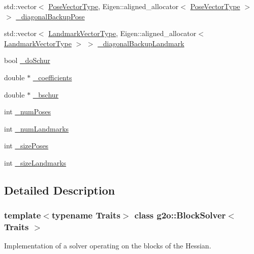 \begin{DoxyCompactItemize}
\item 
std\+::vector$<$ \mbox{\hyperlink{classg2o_1_1_block_solver_a65d51b9281e2e2597df05eb00801ee76}{Pose\+Vector\+Type}}, Eigen\+::aligned\+\_\+allocator$<$ \mbox{\hyperlink{classg2o_1_1_block_solver_a65d51b9281e2e2597df05eb00801ee76}{Pose\+Vector\+Type}} $>$ $>$ \mbox{\hyperlink{classg2o_1_1_block_solver_a3cb6f86c522c2ea26478ad44b7c32f76}{\+\_\+diagonal\+Backup\+Pose}}
\item 
std\+::vector$<$ \mbox{\hyperlink{classg2o_1_1_block_solver_a19ade5e432f32e46557192ae75074304}{Landmark\+Vector\+Type}}, Eigen\+::aligned\+\_\+allocator$<$ \mbox{\hyperlink{classg2o_1_1_block_solver_a19ade5e432f32e46557192ae75074304}{Landmark\+Vector\+Type}} $>$ $>$ \mbox{\hyperlink{classg2o_1_1_block_solver_a3bc5b19faa2c45e2c04a6743b3a083de}{\+\_\+diagonal\+Backup\+Landmark}}
\item 
bool \mbox{\hyperlink{classg2o_1_1_block_solver_ab375a5fac964182442f38288bd8a103a}{\+\_\+do\+Schur}}
\item 
double $\ast$ \mbox{\hyperlink{classg2o_1_1_block_solver_a416f480d4b27d7f8962ae7ae363f2e32}{\+\_\+coefficients}}
\item 
double $\ast$ \mbox{\hyperlink{classg2o_1_1_block_solver_aafddeb1d0a4218fc9c3c77169e20f81a}{\+\_\+bschur}}
\item 
int \mbox{\hyperlink{classg2o_1_1_block_solver_a709259fc290d746f4174d25410b7458a}{\+\_\+num\+Poses}}
\item 
int \mbox{\hyperlink{classg2o_1_1_block_solver_ab98231b7ca8e6d7f138c33d26c6f4326}{\+\_\+num\+Landmarks}}
\item 
int \mbox{\hyperlink{classg2o_1_1_block_solver_a39ec000379885ce09cdd8c23ab6d4567}{\+\_\+size\+Poses}}
\item 
int \mbox{\hyperlink{classg2o_1_1_block_solver_a13a49b5aac8ae3b12ed0c349fc0788e7}{\+\_\+size\+Landmarks}}
\end{DoxyCompactItemize}


\subsection{Detailed Description}
\subsubsection*{template$<$typename Traits$>$\newline
class g2o\+::\+Block\+Solver$<$ Traits $>$}

Implementation of a solver operating on the blocks of the Hessian. 

